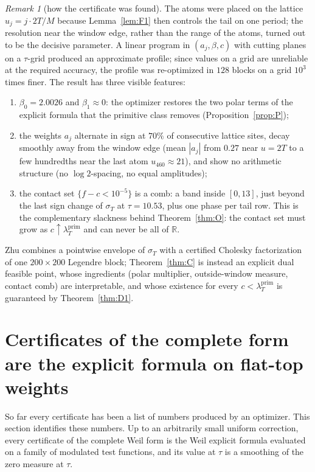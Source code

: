 \documentclass[11pt]{amsart}
\theoremstyle{definition}
\theoremstyle{remark}
\newtheorem{remark}[theorem]{Remark}
\newcommand{\R}{\mathbb R}
\newcommand{\lamP}{\lambda^{\mathrm{prim}}_T}
\newcommand{\sT}{\sigma_T}
\begin{document}
\begin{remark}[how the certificate was found]
The atoms were placed on the lattice $u_j=j\cdot2T/M$ because Lemma~\ref{lem:F1} then controls the
tail on one period; the resolution near the window edge, rather than the range of the atoms, turned
out to be the decisive parameter. A linear program in $(a_j,\beta,c)$ with cutting planes on a
$\tau$-grid produced an approximate profile; since values on a grid are unreliable at the required
accuracy, the profile was re-optimized in $128$ blocks on a grid $10^3$ times finer. The result has three visible features:
\begin{enumerate}
\item $\beta_0=2.0026$ and $\beta_1\approx0$: the optimizer restores the two polar terms of the
explicit formula that the primitive class removes (Proposition~\ref{prop:P});
\item the weights $a_j$ alternate in sign at $70\%$ of consecutive lattice sites, decay smoothly away
from the window edge (mean $|a_j|$ from $0.27$ near $u=2T$ to a few hundredths near the last atom $u_{460}\approx21$), and show no
arithmetic structure (no $\log2$-spacing, no equal amplitudes);
\item the contact set $\{f-c<10^{-5}\}$ is a comb: a band inside $[0,13]$, just beyond the last
sign change of $\sT$ at $\tau=10.53$, plus one phase per tail row. This is the complementary
slackness behind Theorem~\ref{thm:O}: the contact set must grow as $c\uparrow\lamP$ and can never be
all of $\R$.
\end{enumerate}
\end{remark}

Zhu \cite[Thm.~1.2]{Zhu2026} combines a pointwise envelope of $\sT$ with a certified Cholesky
factorization of one $200\times200$ Legendre block; Theorem~\ref{thm:C} is instead an explicit dual
feasible point, whose ingredients (polar multiplier, outside-window measure, contact comb) are
interpretable, and whose existence for every $c<\lamP$ is guaranteed by Theorem~\ref{thm:D1}.


\section{Certificates of the complete form are the explicit formula on flat-top weights}\label{sec:Z}

So far every certificate has been a list of numbers produced by an optimizer. This section
identifies these numbers. Up to an arbitrarily small uniform correction, every certificate of the
complete Weil form is the Weil explicit formula evaluated on a family of modulated test functions,
and its value at $\tau$ is a smoothing of the zero measure at $\tau$.
\end{document}
